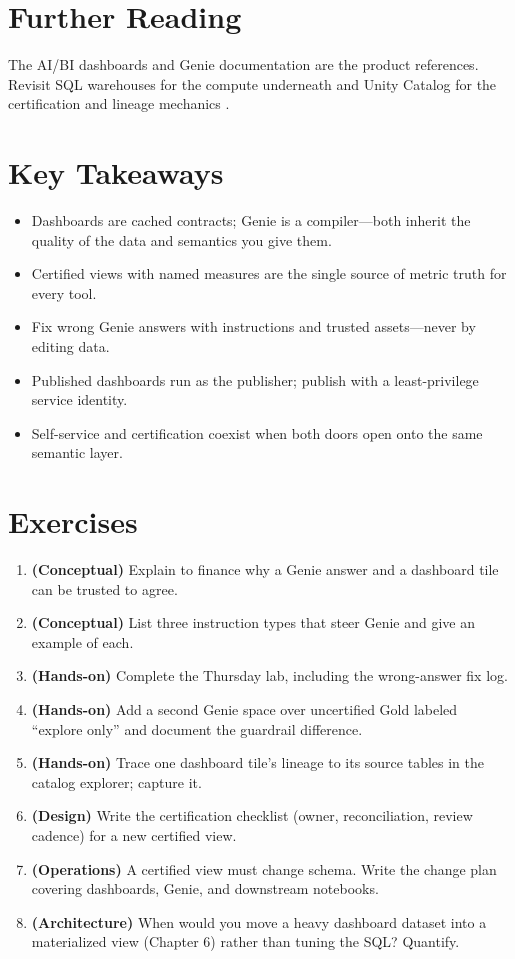 \section{Further Reading}
The AI/BI dashboards \cite{databricksDashboards} and Genie \cite{databricksGenie} documentation are the product references. Revisit SQL warehouses for the compute underneath \cite{databricksSQLWarehouses} and Unity Catalog for the certification and lineage mechanics \cite{databricksUnityCatalog,databricksLineage}.

\section*{Key Takeaways}
\begin{itemize}
    \item Dashboards are cached contracts; Genie is a compiler---both inherit the quality of the data and semantics you give them.
    \item Certified views with named measures are the single source of metric truth for every tool.
    \item Fix wrong Genie answers with instructions and trusted assets---never by editing data.
    \item Published dashboards run as the publisher; publish with a least-privilege service identity.
    \item Self-service and certification coexist when both doors open onto the same semantic layer.
\end{itemize}

\section{Exercises}
\begin{enumerate}
    \item \textbf{(Conceptual)} Explain to finance why a Genie answer and a dashboard tile can be trusted to agree.
    \item \textbf{(Conceptual)} List three instruction types that steer Genie and give an example of each.
    \item \textbf{(Hands-on)} Complete the Thursday lab, including the wrong-answer fix log.
    \item \textbf{(Hands-on)} Add a second Genie space over uncertified Gold labeled ``explore only'' and document the guardrail difference.
    \item \textbf{(Hands-on)} Trace one dashboard tile's lineage to its source tables in the catalog explorer; capture it.
    \item \textbf{(Design)} Write the certification checklist (owner, reconciliation, review cadence) for a new certified view.
    \item \textbf{(Operations)} A certified view must change schema. Write the change plan covering dashboards, Genie, and downstream notebooks.
    \item \textbf{(Architecture)} When would you move a heavy dashboard dataset into a materialized view (Chapter 6) rather than tuning the SQL? Quantify.
\end{enumerate}
